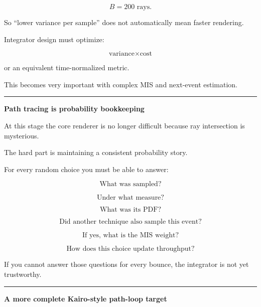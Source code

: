 \[
B=200\text{ rays}.
\]

So ``lower variance per sample'' does not automatically mean faster rendering.

Integrator design must optimize:

\[
\boxed{
\text{variance}\times\text{cost}
}
\]

or an equivalent time-normalized metric.

This becomes very important with complex MIS and next-event estimation.

\begin{center}\rule{0.5\linewidth}{0.5pt}\end{center}

\textbf{Path tracing is probability bookkeeping}

At this stage the core renderer is no longer difficult because ray intersection is mysterious.

The hard part is maintaining a consistent probability story.

For every random choice you must be able to answer:

\[
\text{What was sampled?}
\]

\[
\text{Under what measure?}
\]

\[
\text{What was its PDF?}
\]

\[
\text{Did another technique also sample this event?}
\]

\[
\text{If yes, what is the MIS weight?}
\]

\[
\text{How does this choice update throughput?}
\]

If you cannot answer those questions for every bounce, the integrator is not yet trustworthy.

\begin{center}\rule{0.5\linewidth}{0.5pt}\end{center}

\textbf{A more complete Kairo-style path-loop target}


